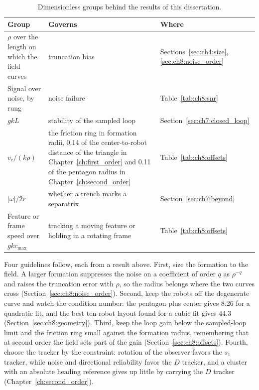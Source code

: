 \begin{table}[htbp]
\centering
\caption{Dimensionless groups behind the results of this dissertation.}
\label{tab:ch8:groups}
\small
\begin{tabular}{>{\raggedright\arraybackslash}p{4.4cm} >{\raggedright\arraybackslash}p{4.0cm} >{\raggedright\arraybackslash}p{4.0cm}}
\hline
Group & Governs & Where \\
\hline
$\rho$ over the length on which the field curves & truncation bias & Sections~\ref{sec:ch4:size}, \ref{sec:ch8:noise_order} \\
Signal over noise, by rung & noise failure & Table~\ref{tab:ch8:snr} \\
$gkL$ & stability of the sampled loop & Section~\ref{sec:ch7:closed_loop} \\
$v_c/(k\rho)$ & the friction ring in formation radii, 0.14 of the center-to-robot distance of the triangle in Chapter~\ref{ch:first_order} and 0.11 of the pentagon radius in Chapter~\ref{ch:second_order} & Table~\ref{tab:ch8:offsets} \\
$\lvert\omega\rvert/2r$ & whether a trench marks a separatrix & Section~\ref{sec:ch7:beyond} \\
Feature or frame speed over $gkc_{\max}$ & tracking a moving feature or holding in a rotating frame & Table~\ref{tab:ch8:offsets} \\
\hline
\end{tabular}
\end{table}

Four guidelines follow, each from a result above. First, size the
formation to the field. A larger formation suppresses the noise on a
coefficient of order $q$ as $\rho^{-q}$ and raises the truncation error with
$\rho$, so the radius belongs where the two curves cross
(Section~\ref{sec:ch8:noise_order}). Second, keep the robots off the
degenerate curve and watch the condition number: the pentagon plus center
gives 8.26 for a quadratic fit, and the best ten-robot layout found for a
cubic fit gives 44.3 (Section~\ref{sec:ch8:geometry}). Third, keep the loop
gain below the sampled-loop limit and the friction ring small against the
formation radius, remembering that at second order the field sets part of the
gain (Section~\ref{sec:ch8:offsets}). Fourth, choose the tracker by the
constraint: rotation of the observer favors the $s_1$ tracker, while noise
and directional reliability favor the $D$ tracker, and a cluster with an
absolute heading reference gives up little by carrying the $D$ tracker
(Chapter~\ref{ch:second_order}).

